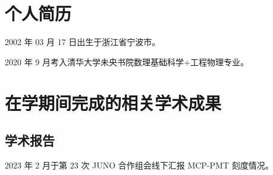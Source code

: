 
\begin{resume}

  \section*{个人简历}

  2002 年 03 月 17 日出生于浙江省宁波市。

  2020 年 9 月考入清华大学未央书院数理基础科学+工程物理专业。

  \section*{在学期间完成的相关学术成果}

  \subsection*{学术报告}

  2023 年 2 月于第 23 次 JUNO 合作组会线下汇报 MCP-PMT 刻度情况。

\end{resume}
